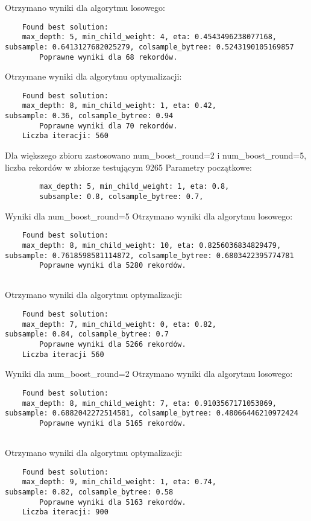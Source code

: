 \documentclass[a4paper,12p]{article}
\begin{document}
	Otrzymano wyniki dla algorytmu losowego:
	\begin{verbatim}
	Found best solution:
	max_depth: 5, min_child_weight: 4, eta: 0.4543496238077168,
subsample: 0.6413127682025279, colsample_bytree: 0.5243190105169857
        Poprawne wyniki dla 68 rekordów.
	\end{verbatim}
	
	Otrzymane wyniki dla algorytmu optymalizacji:
	\begin{verbatim}
	Found best solution:
	max_depth: 8, min_child_weight: 1, eta: 0.42,
subsample: 0.36, colsample_bytree: 0.94
        Poprawne wyniki dla 70 rekordów.
	Liczba iteracji: 560
	\end{verbatim}
	
	Dla większego zbioru zastosowano num_boost_round=2 i num_boost_round=5, liczba rekordów w zbiorze testującym 9265  
	Parametry początkowe:
	\begin{verbatim}
		max_depth: 5, min_child_weight: 1, eta: 0.8,
		subsample: 0.8, colsample_bytree: 0.7,	
	\end{verbatim}
	
	Wyniki dla num_boost_round=5
	Otrzymano wyniki dla algorytmu losowego:
	\begin{verbatim}
	Found best solution:
	max_depth: 8, min_child_weight: 10, eta: 0.8256036834829479,
subsample: 0.7618598581114872, colsample_bytree: 0.6803422395774781
        Poprawne wyniki dla 5280 rekordów.
	
	\end{verbatim}Otrzymano wyniki dla algorytmu optymalizacji:
	\begin{verbatim}
	Found best solution:
	max_depth: 7, min_child_weight: 0, eta: 0.82,
subsample: 0.84, colsample_bytree: 0.7
        Poprawne wyniki dla 5266 rekordów.
	Liczba iteracji 560
	\end{verbatim}
	
	Wyniki dla num_boost_round=2
	Otrzymano wyniki dla algorytmu losowego:
	\begin{verbatim}
	Found best solution:
	max_depth: 8, min_child_weight: 7, eta: 0.9103567171053869,
subsample: 0.6882042272514581, colsample_bytree: 0.48066446210972424
        Poprawne wyniki dla 5165 rekordów.
	
	\end{verbatim}Otrzymano wyniki dla algorytmu optymalizacji:
	\begin{verbatim}
	Found best solution:
	max_depth: 9, min_child_weight: 1, eta: 0.74,
subsample: 0.82, colsample_bytree: 0.58
        Poprawne wyniki dla 5163 rekordów.
	Liczba iteracji: 900
	\end{verbatim}
	
\end{document}
